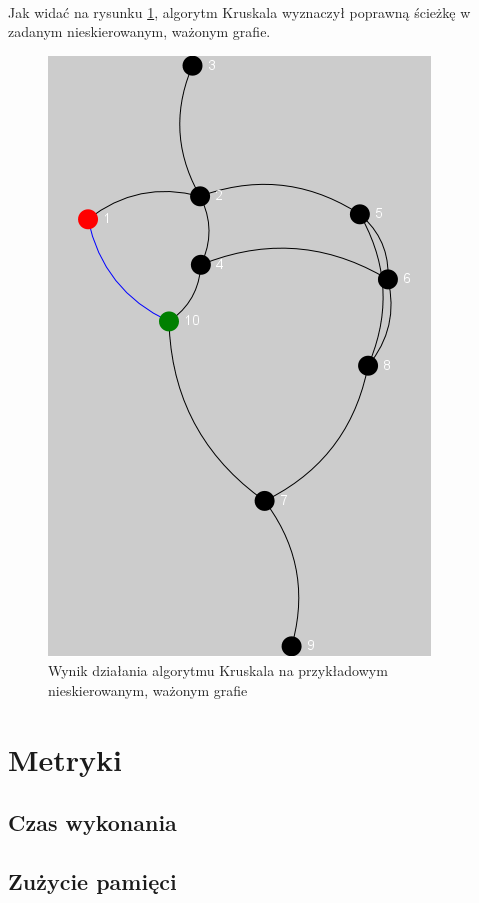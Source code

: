 \paragraph{}
Jak widać na rysunku \ref{fig:kruskal}, algorytm Kruskala wyznaczył poprawną ścieżkę w zadanym nieskierowanym, ważonym grafie.
\begin{figure}[!h]
 \centering
 \includegraphics{algorithms/kruskal}
 \caption{Wynik działania algorytmu Kruskala na przykładowym nieskierowanym, ważonym grafie}
 \label{fig:kruskal}
\end{figure}

\section{Metryki}

\subsection{Czas wykonania}

\subsection{Zużycie pamięci}

